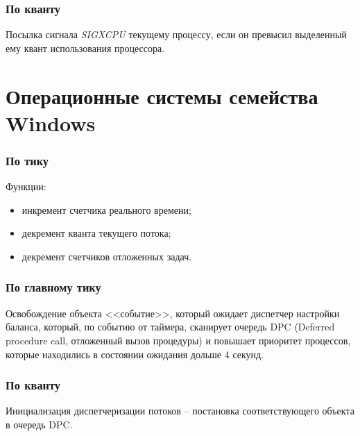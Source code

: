 \subsubsection{По кванту}

Посылка сигнала \textit{SIGXCPU} текущему процессу, если он превысил выделенный ему квант использования процессора.

\section{Операционные системы семейства Windows}

\subsubsection{По тику}

Функции:
\begin{itemize}
	\item инкремент счетчика реального времени;
	\item декремент кванта текущего потока;
	\item декремент счетчиков отложенных задач.
\end{itemize}

\subsubsection{По главному тику}

Освобождение объекта <<событие>>, который ожидает диспетчер настройки баланса, который, по событию от таймера, сканирует очередь DPC (Deferred procedure call, отложенный вызов процедуры) и повышает приоритет процессов, которые находились в состоянии ожидания дольше 4 секунд.

\subsubsection{По кванту}

Инициализация диспетчеризации потоков -- постановка соответствующего объекта в очередь DPC.